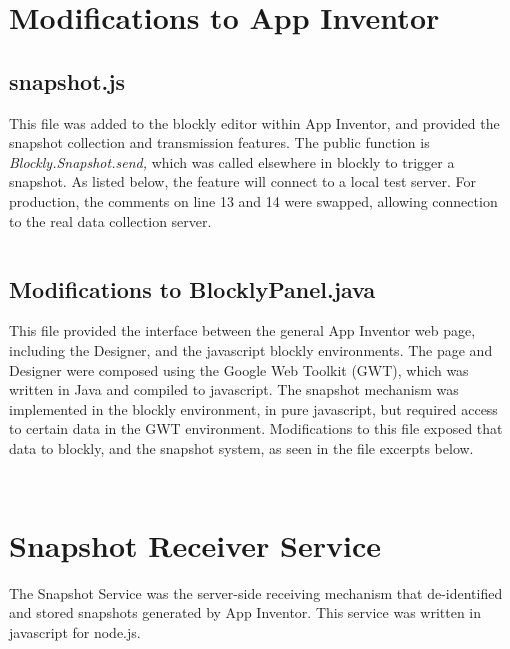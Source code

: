 

\section{Modifications to App Inventor}
\label{src:appinventor}

\subsection{snapshot.js}
\label{src:ai/snapshot.js}
This file was added to the blockly editor within App Inventor, and provided the snapshot collection and transmission features. The public function is \emph{Blockly.Snapshot.send,} which was called elsewhere in blockly to trigger a snapshot. As listed below, the feature will connect to a local test server. For production, the comments on line 13 and 14 were swapped, allowing connection to the real data collection server. 
\inputminted{javascript}{src/appinventor/snapshot.js}

\subsection{Modifications to BlocklyPanel.java}
\label{src:ai/BlocklyPanel.java}
This file provided the interface between the general App Inventor web page, including the Designer, and the javascript blockly environments. The page and Designer were composed using the Google Web Toolkit (GWT), which was written in Java and compiled to javascript. The snapshot mechanism was implemented in the blockly environment, in pure javascript, but required access to certain data in the GWT environment. Modifications to this file exposed that data to blockly, and the snapshot system, as seen in the file excerpts below.

\inputminted[firstline=626, lastline=651]{java}{src/appinventor/BlocklyPanel.java}
\inputminted[firstline=902, lastline=913, breakbefore=.]{java}{src/appinventor/BlocklyPanel.java}


\section{Snapshot Receiver Service}
\label{src:snapshot-service}
The Snapshot Service was the server-side receiving mechanism that de-identified and stored snapshots generated by App Inventor. This service was written in javascript for node.js.

